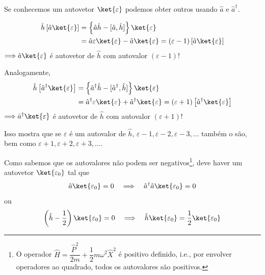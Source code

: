 Se conhecemos um autovetor $\ket{\varepsilon}$ podemos obter outros usando $\hat{a}$ e $\hat{a}^\dagger$.

\begin{align}
    \hat{h}\left[ \hat{a}\ket{\varepsilon} \right] &= \left\{ \hat{a}\hat{h} - [\hat{a}, \hat{h}] \right\}\ket{\varepsilon} \notag \\
    &= \hat{a}\varepsilon\ket{\varepsilon} - \hat{a}\ket{\varepsilon} = (\varepsilon - 1)\left[ \hat{a}\ket{\varepsilon} \right]
\label{eq:aula18_h_a_ket}
\end{align}
$\Longrightarrow \hat{a}\ket{\varepsilon}$ é autovetor de $\hat{h}$ com autovalor $(\varepsilon - 1)$!

Analogamente,
\begin{align}
    \hat{h}\left[ \hat{a}^\dagger\ket{\varepsilon} \right] &= \left\{ \hat{a}^\dagger\hat{h} - [\hat{a}^\dagger, \hat{h}] \right\}\ket{\varepsilon} \notag \\
    &= \hat{a}^\dagger\varepsilon\ket{\varepsilon} + \hat{a}^\dagger\ket{\varepsilon} = (\varepsilon + 1)\left[ \hat{a}^\dagger\ket{\varepsilon} \right]
\label{eq:aula18_h_adagger_ket}
\end{align}
$\Longrightarrow \hat{a}^\dagger\ket{\varepsilon}$ é autovetor de $\hat{h}$ com autovalor $(\varepsilon + 1)$!

Isso mostra que se $\varepsilon$ é um autovalor de $\hat{h}$, $\varepsilon - 1, \varepsilon - 2, \varepsilon - 3, \dots$ também o são, bem como $\varepsilon + 1, \varepsilon + 2, \varepsilon + 3, \dots$.

Como sabemos que os autovalores não podem ser negativos\footnote{O operador $\hat{H} = \dfrac{\hat{P}^2}{2m} + \dfrac{1}{2}m\omega^2\hat{X}^2$ é positivo definido, i.e., por envolver operadores ao quadrado, todos os autovalores são positivos.}, deve haver um autovetor $\ket{\varepsilon_0}$ tal que
\begin{equation}
    \hat{a}\ket{\varepsilon_0} = 0 \quad \Longrightarrow \quad \hat{a}^\dagger\hat{a}\ket{\varepsilon_0} = 0
\label{eq:aula18_a_ket_eps0}
\end{equation}
ou
\begin{equation}
    \left( \hat{h} - \frac{1}{2} \right)\ket{\varepsilon_0} = 0 \quad \Longrightarrow \quad \hat{h}\ket{\varepsilon_0} = \frac{1}{2}\ket{\varepsilon_0}
\label{eq:aula18_h_eps0}
\end{equation}


